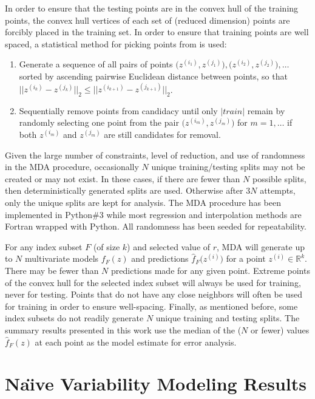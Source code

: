 In order to ensure that the testing points are in the convex hull of
the training points, the convex hull vertices of each set of (reduced
dimension) points are forcibly placed in the training set. In order to
ensure that training points are well spaced, a statistical method for
picking points from \citet{amos2014algorithm} is used:
\begin{enumerate}
\item Generate a sequence of all pairs of points
  $\bigl(z^{(i_1)},z^{(j_1)}\bigr), \bigl(z^{(i_2)},z^{(j_2)}\bigr),
  \ldots$ sorted by ascending pairwise Euclidean distance between
  points, so that $\bigl|\bigl|z^{(i_k)}-z^{(j_k)}\bigr|\bigr|_2 \leq
  \bigl|\bigl|z^{(i_{k+1})}-z^{(j_{k+1})}\bigr|\bigr|_2$.
\item Sequentially remove points from candidacy until only $|train|$
  remain by randomly selecting one point from the pair
  $\bigl(z^{(i_m)}, z^{(j_m)}\bigr)$ for $m = 1,\ldots$ if both
  $z^{(i_m)}$ and $z^{(j_m)}$ are still candidates for removal.
\end{enumerate}

Given the large number of constraints, level of reduction, and use of
randomness in the MDA procedure, occasionally $N$ unique
training/testing splits may not be created or may not exist. In these
cases, if there are fewer than $N$ possible splits, then
deterministically generated splits are used. Otherwise after $3N$
attempts, only the unique splits are kept for analysis. The MDA
procedure has been implemented in Python\#3 while most regression and
interpolation methods are Fortran wrapped with Python. All randomness
has been seeded for repeatability.

For any index subset $F$ (of size $k$) and selected value of $r$, MDA
will generate up to $N$ multivariate models $f_F(z)$ and predictions
$\hat{f}_F\big(z^{(i)}\big)$ for a point $z^{(i)} \in \mathbb{R}^k$.
There may be fewer than $N$ predictions made for any given
point. Extreme points of the convex hull for the selected index subset
will always be used for training, never for testing. Points that do
not have any close neighbors will often be used for training in order
to ensure well-spacing. Finally, as mentioned before, some index
subsets do not readily generate $N$ unique training and testing
splits. The summary results presented in this work use the median of
the ($N$ or fewer) values $\hat{f}_F(z)$ at each point as the model
estimate for error analysis.


\section{Na\"{\i}ve Variability Modeling Results}


